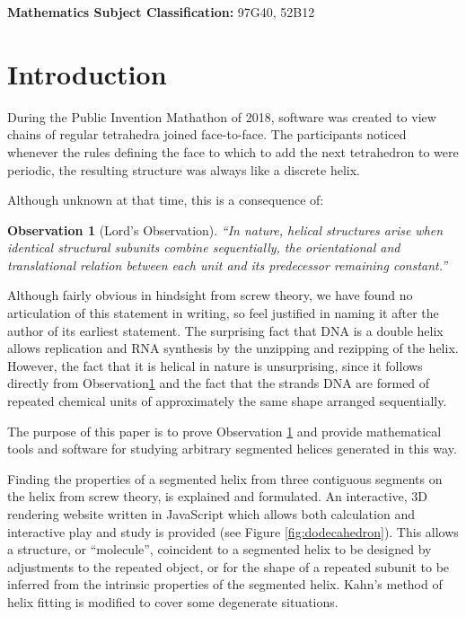 \documentclass{svproc}
\newtheorem{observation}{Observation}
\begin{document}


\makeatletter
\newcommand{\subjclass}[1]{%
    \small
    \textbf{Mathematics Subject Classification:} #1}


\makeatother

\subjclass{ 97G40, 52B12}

\section{Introduction}

During the Public Invention Mathathon of 2018\cite{read2019mathathon}, software was
created to view chains of regular tetrahedra joined face-to-face.
The participants noticed whenever the rules
defining the face to which to add the next
tetrahedron
to were periodic, the resulting
structure was always like a discrete helix.

Although unknown at that time, this is a consequence of:
\begin{observation}[Lord's Observation]
  “In nature, helical structures arise when identical structural subunits combine sequentially, the orientational and translational relation between each unit and its predecessor remaining constant.”\cite{lord2002helical}
  \label{obs:lords}
\end{observation}
Although fairly obvious in hindsight from screw theory, we have found no articulation of this statement
in writing, so feel justified in naming it after the author of its earliest statement.
The surprising fact that DNA is a double helix allows replication and RNA synthesis by the unzipping and rezipping
of the helix.
However, the fact that it is helical in nature is unsurprising, since it follows directly from Observation\ref{obs:lords} and the
fact that the strands DNA are formed of repeated chemical units of approximately the same shape arranged sequentially.

The purpose of this paper is to prove Observation \ref{obs:lords} and provide mathematical
tools and software for studying arbitrary
segmented helices generated in this way.

Finding the properties of a segmented helix from three contiguous segments on the helix from screw theory\cite{abbasi2015review,wittenburg2016kinematics,kahn1989defining},
is explained and formulated.
An interactive, 3D rendering website written in JavaScript which allows both calculation and
interactive play and study is provided\cite{segmentedhelixinteractive}
(see Figure \ref{fig:dodecahedron}). This allows
a structure, or ``molecule'', coincident to a segmented helix to be designed
by adjustments to the repeated object, or for the shape of
a repeated subunit to be inferred from the intrinsic properties of the
segmented helix.
Kahn's method of helix fitting\cite{kahn1989defining,enkhbayar2008helfit,lee2007qhelix} is modified to cover some degenerate situations.
\end{document}
